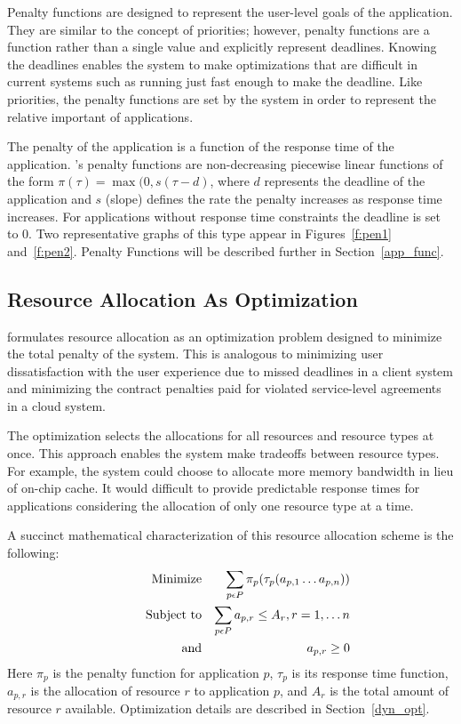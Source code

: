Penalty functions are designed to represent the user-level goals of the application. They are similar to the concept of priorities; however, penalty functions are a function rather than a single value and explicitly represent deadlines.  Knowing the deadlines enables the system to make optimizations that are difficult in current systems such as running just fast enough to make the deadline. Like priorities, the penalty functions are set by the system in order to represent the relative important of applications.

The penalty of the application is a function of the response time of the application.  \pacora's penalty functions are non-decreasing piecewise linear functions of the form
$\pi(\tau) = \max(0, s(\tau - d)$, where $d$ represents the deadline of the application and $s$ (slope) defines the rate the penalty increases as response time increases. For applications without response time constraints the deadline is set to $0$. Two representative graphs of this type appear in Figures~\ref{f:pen1} and~\ref{f:pen2}. Penalty Functions will be described further in Section~\ref{app_func}.

\subsection*{Resource Allocation As Optimization}
\pacora formulates resource allocation as an optimization problem designed to minimize the total penalty of the system. This is analogous to minimizing user dissatisfaction with the user experience due to missed deadlines in a client system and minimizing the contract penalties paid for violated service-level agreements in a cloud system. 

The optimization selects the allocations for all resources and resource types at once.  This approach enables the system make tradeoffs between resource types.  For example, the system could choose to allocate more memory bandwidth in lieu of on-chip cache.  It would difficult to provide predictable response times for applications considering the allocation of only one resource type at a time.

A succinct mathematical characterization of this resource allocation scheme is the following:
\begin{eqnarray*}
& \makebox[1in][r]{Minimize}   & \sum_{p\epsilon P} {\pi_p(\tau_p(a_{p,1}\ldots a_{p,n}))}  \\
& \makebox[1in][r]{Subject to} & \sum_{p\epsilon P} a_{p,r} \leq A_r, r = 1,\ldots n        \\
& \makebox[1in][r]{and}        & a_{p,r} \geq 0
\end{eqnarray*}
Here $\pi_p$ is the penalty function for application $p$,
$\tau_p$ is its response time function,
$a_{p,r}$ is the allocation of resource $r$ to application $p$,
and $A_r$ is the total amount of resource $r$ available.  Optimization details are described in Section~\ref{dyn_opt}.

